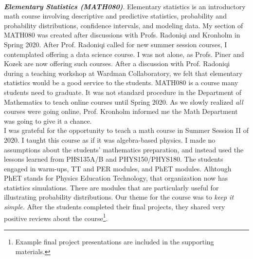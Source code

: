\documentclass[../../../main.tex]{subfiles}
\begin{document}
\\
\vspace{0.25cm}
\textbf{\textit{Elementary Statistics (MATH080)}}. Elementary statistics is an introductory math course involving descriptive and predictive statistics, probability and probability distributions, confidence intervals, and modeling data.  My section of MATH080 was created after discussions with Profs. Radoniqi and Kronholm in Spring 2020.  After Prof. Radoniqi called for new summer session courses, I contemplated offering a data science course.  I was not alone, as Profs. Piner and Kozek are now offering such courses.  After a discussion with Prof. Radoniqi during a teaching workshop at Wardman Collaboratory, we felt that elementary statistics would be a good service to the students.  MATH080 is a course many students need to graduate.  It was not standard procedure in the Department of Mathematics to teach online courses until Spring 2020.  As we slowly realized \textit{all} courses were going online, Prof. Kronholm informed me the Math Department was going to give it a chance.
\\
\vspace{0.25cm}
I was grateful for the opportunity to teach a math course in Summer Session II of 2020.  I taught this course as if it was algebra-based physics.  I made no assumptions about the students' mathematics preparation, and instead used the lessons learned from PHS135A/B and PHYS150/PHYS180.  The students engaged in warm-ups, TT and PER modules, and PhET modules.  Alhtough PhET stands for Physics Education Technology, that organization now has statistics simulations.  There are modules that are particularly useful for illustrating probability distributions.  Our theme for the course was to \textit{keep it simple.}  After the students completed their final projects, they shared very positive reviews about the course\footnote{Example final project presentations are included in the supporting materials.}.
\end{document}
